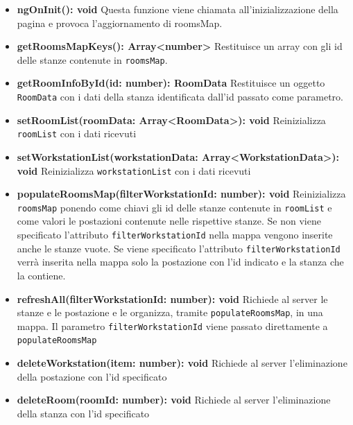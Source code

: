 \begin{itemize}
	\item \textbf{ngOnInit(): void} \newline
	Questa funzione viene chiamata all'inizializzazione della pagina e provoca l'aggiornamento di roomsMap.
	\item \textbf{getRoomsMapKeys(): Array<number>} \newline
	Restituisce un array con gli id delle stanze contenute in \texttt{roomsMap}.
	\item \textbf{getRoomInfoById(id: number): RoomData} \newline
	Restituisce un oggetto \texttt{RoomData} con i dati della stanza identificata dall'id passato come parametro.
	\item \textbf{setRoomList(roomData: Array<RoomData>): void} \newline
	Reinizializza \texttt{roomList} con i dati ricevuti
	\item \textbf{setWorkstationList(workstationData: Array<WorkstationData>): void} \newline
	Reinizializza \texttt{workstationList} con i dati ricevuti
	\item \textbf{populateRoomsMap(filterWorkstationId: number): void} \newline
	Reinizializza \texttt{roomsMap} ponendo come chiavi gli id delle stanze contenute in \texttt{roomList} e come valori le postazioni contenute nelle rispettive stanze. \newline
	Se non viene specificato l'attributo \texttt{filterWorkstationId} nella mappa vengono inserite anche le stanze vuote. \newline
	Se viene specificato l'attributo \texttt{filterWorkstationId} verrà inserita nella mappa solo la postazione con l'id indicato e la stanza che la contiene.
	\item \textbf{refreshAll(filterWorkstationId: number): void} \newline
	Richiede al server le stanze e le postazione e le organizza, tramite \texttt{populateRoomsMap}, in una mappa. Il parametro \texttt{filterWorkstationId} viene passato direttamente a \texttt{populateRoomsMap}
	\item \textbf{deleteWorkstation(item: number): void} \newline
	Richiede al server l'eliminazione della postazione con l'id specificato
	\item \textbf{deleteRoom(roomId: number): void} \newline
	Richiede al server l'eliminazione della stanza con l'id specificato

\end{itemize}

